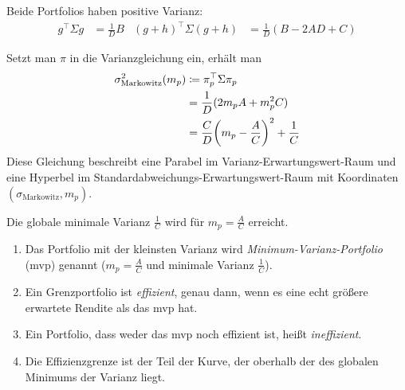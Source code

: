 \documentclass[a4paper,twoside,DIV15,BCOR12mm]{scrbook}
\begin{document}
Beide Portfolios haben positive Varianz:
\begin{align*}
g^\top \Sigma g &= \frac 1 D B &
(g+h)^\top \Sigma (g+h) &= \frac 1D (B- 2AD + C)
\end{align*}

Setzt man $\pi$ in die Varianzgleichung ein, erhält man 
\begin{align*}
\sigma^2_{\text{Markowitz}}(m_p) &\da \pi_p^\top \Sigma \pi_p \\
&= \frac 1 D (2m_pA + m_p^2C) \\
&= \frac C D \bigg(m_p - \frac AC\bigg)^2 + \frac 1C
\end{align*}
Diese Gleichung beschreibt eine Parabel im Varianz-Erwartungswert-Raum und eine Hyperbel im Standardabweichungs-Erwartungswert-Raum mit Koordinaten $(\sigma_{\text{Markowitz}},m_p)$.

Die globale minimale Varianz $\frac 1C$ wird für $m_p=\frac AC$ erreicht.

\begin{bemerkung}
\begin{enumerate}
\item Das Portfolio mit der kleinsten Varianz wird \emph{Minimum-Varianz-Portfolio} (mvp) genannt ($m_p=\frac AC$ und minimale Varianz $\frac 1C$).
\item Ein Grenzportfolio ist \emph{effizient}, genau dann, wenn es eine echt größere erwartete Rendite als das mvp hat.
\item Ein Portfolio, dass weder das mvp noch effizient ist, heißt \emph{ineffizient}.
\item Die Effizienzgrenze ist der Teil der Kurve, der oberhalb der des globalen Minimums der Varianz liegt.
\end{enumerate}
\end{bemerkung}

\begin{center}
\end{center}
\end{document}
